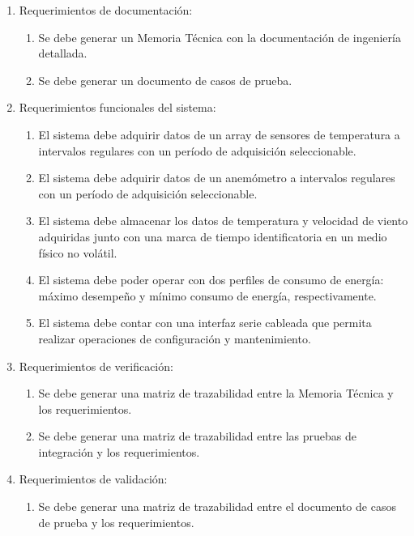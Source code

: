 \begin{enumerate}
  \item Requerimientos de documentación:
   \begin{enumerate}
     \item Se debe generar un Memoria Técnica con la documentación de ingeniería detallada.
	   \item Se debe generar un documento de casos de prueba.
	 \end{enumerate}
	\item Requerimientos funcionales del sistema:
	\begin{enumerate}
		\item El sistema debe adquirir datos de un array de sensores de temperatura a intervalos regulares con un período de adquisición seleccionable.
		\item El sistema debe adquirir datos de un anemómetro a intervalos regulares con un período de adquisición seleccionable.
		\item El sistema debe almacenar los datos de temperatura y velocidad de viento adquiridas junto con una marca de tiempo identificatoria en un medio físico no volátil.
		\item El sistema debe poder operar con dos perfiles de consumo de energía: máximo desempeño y mínimo consumo de energía, respectivamente.
		\item El sistema debe contar con una interfaz serie cableada que permita realizar operaciones de configuración y mantenimiento.
	\end{enumerate}
	\item Requerimientos de verificación:
	\begin{enumerate}
		\item Se debe generar una matriz de trazabilidad entre la Memoria Técnica y los requerimientos.
		\item Se debe generar una matriz de trazabilidad entre las pruebas de integración y los requerimientos.
	\end{enumerate}
	\item Requerimientos de validación:
	\begin{enumerate}
	  \item Se debe generar una matriz de trazabilidad entre el documento de casos de prueba y los requerimientos.
  \end{enumerate}
\end{enumerate}

